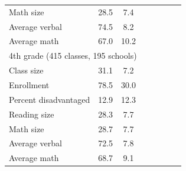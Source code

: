 \begin{tabular}{lccccccc}
Math size & 28.5 & 7.4 & & & & & \\
Average verbal & 74.5 & 8.2 & & & & & \\
Average math & 67.0 & 10.2 & & & & & \\
\multicolumn{8}{l}{4th grade (415 classes, 195 schools)} \\
Class size & 31.1 & 7.2 & & & & & \\
Enrollment & 78.5 & 30.0 & & & & & \\
Percent disadvantaged & 12.9 & 12.3 & & & & & \\
Reading size & 28.3 & 7.7 & & & & & \\
Math size & 28.7 & 7.7 & & & & & \\
Average verbal & 72.5 & 7.8 & & & & & \\
Average math & 68.7 & 9.1 & & & & & \\
\bottomrule
\end{tabular}
